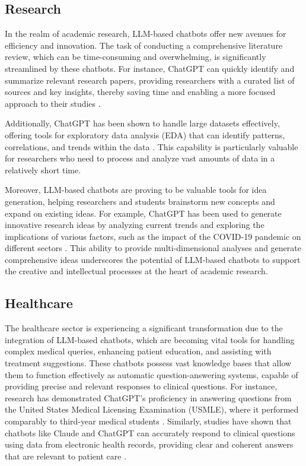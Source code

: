 \subsection{Research}

In the realm of academic research, LLM-based chatbots offer new avenues for efficiency and innovation. The task of conducting a comprehensive literature review, which can be time-consuming and overwhelming, is significantly streamlined by these chatbots. For instance, ChatGPT can quickly identify and summarize relevant research papers, providing researchers with a curated list of sources and key insights, thereby saving time and enabling a more focused approach to their studies \cite{chandha2023setting}.

Additionally, ChatGPT has been shown to handle large datasets effectively, offering tools for exploratory data analysis (EDA) that can identify patterns, correlations, and trends within the data \cite{jiang2023}. This capability is particularly valuable for researchers who need to process and analyze vast amounts of data in a relatively short time.

Moreover, LLM-based chatbots are proving to be valuable tools for idea generation, helping researchers and students brainstorm new concepts and expand on existing ideas. For example, ChatGPT has been used to generate innovative research ideas by analyzing current trends and exploring the implications of various factors, such as the impact of the COVID-19 pandemic on different sectors \cite{temsah2023reflection}. This ability to provide multi-dimensional analyses and generate comprehensive ideas underscores the potential of LLM-based chatbots to support the creative and intellectual processes at the heart of academic research.

\subsection{Healthcare}

The healthcare sector is experiencing a significant transformation due to the integration of LLM-based chatbots, which are becoming vital tools for handling complex medical queries, enhancing patient education, and assisting with treatment suggestions. These chatbots possess vast knowledge bases that allow them to function effectively as automatic question-answering systems, capable of providing precise and relevant responses to clinical questions. For instance, research has demonstrated ChatGPT's proficiency in answering questions from the United States Medical Licensing Examination (USMLE), where it performed comparably to third-year medical students \cite{gilson2023does}. Similarly, studies have shown that chatbots like Claude and ChatGPT can accurately respond to clinical questions using data from electronic health records, providing clear and coherent answers that are relevant to patient care \cite{hamidi2023evaluation}.

